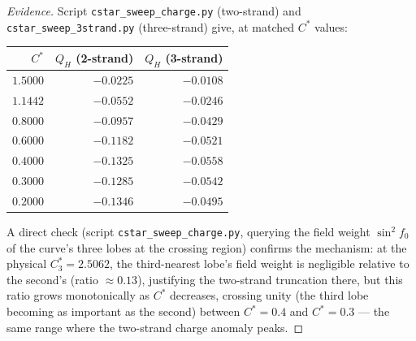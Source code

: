 \documentclass[11pt,a4paper]{article}
\theoremstyle{definition}\newtheorem{definition}[theorem]{Definition}
\theoremstyle{remark}
\theoremstyle{definition}\newtheorem{construction}[theorem]{Construction}
\newcommand{\QH}{Q_H}
\begin{document}
\begin{proof}[Evidence]
Script \texttt{cstar\_sweep\_charge.py} (two-strand) and
\texttt{cstar\_sweep\_3strand.py} (three-strand) give, at matched
$C^*$ values:
\begin{center}
\renewcommand{\arraystretch}{1.2}
\begin{tabular}{rrr}
\toprule
$C^*$ & $\QH$ (2-strand) & $\QH$ (3-strand) \\
\midrule
$1.5000$ & $-0.0225$ & $-0.0108$ \\
$1.1442$ & $-0.0552$ & $-0.0246$ \\
$0.8000$ & $-0.0957$ & $-0.0429$ \\
$0.6000$ & $-0.1182$ & $-0.0521$ \\
$0.4000$ & $-0.1325$ & $-0.0558$ \\
$0.3000$ & $-0.1285$\footnotemark & $-0.0542$ \\
$0.2000$ & $-0.1346$ & $-0.0495$ \\
\bottomrule
\end{tabular}
\end{center}
A direct check (script \texttt{cstar\_sweep\_charge.py}, querying the
field weight $\sin^2\!f_0$ of the curve's three lobes at the crossing
region) confirms the mechanism: at the physical $C_3^*=2.5062$, the
third-nearest lobe's field weight is negligible relative to the
second's (ratio $\approx0.13$), justifying the two-strand truncation
there, but this ratio grows monotonically as $C^*$ decreases, crossing
unity (the third lobe becoming as important as the second) between
$C^*=0.4$ and $C^*=0.3$ --- the same range where the two-strand
charge anomaly peaks.
\end{proof}
\end{document}
